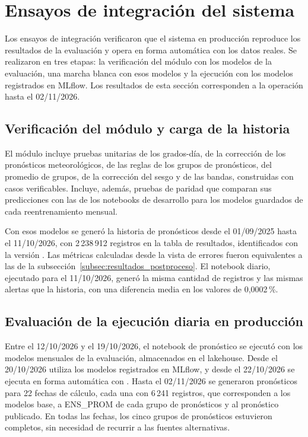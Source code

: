 \section{Ensayos de integración del sistema}
\label{sec:ensayos_integracion}

Los ensayos de integración verificaron que el sistema en producción reproduce los resultados de la evaluación y opera en forma automática con los datos reales. Se realizaron en tres etapas: la verificación del módulo con los modelos de la evaluación, una marcha blanca con esos modelos y la ejecución con los modelos registrados en MLflow. Los resultados de esta sección corresponden a la operación hasta el 02/11/2026.

\subsection{Verificación del módulo y carga de la historia}

El módulo  incluye pruebas unitarias de los grados-día, de la corrección de los pronósticos meteorológicos, de las reglas de los grupos de pronósticos, del promedio de grupos, de la corrección del sesgo y de las bandas, construidas con casos verificables. Incluye, además, pruebas de paridad que comparan sus predicciones con las de los notebooks de desarrollo para los modelos guardados de cada reentrenamiento mensual.

Con esos modelos se generó la historia de pronósticos desde el 01/09/2025 hasta el 11/10/2026, con 2\,238\,912 registros en la tabla de resultados, identificados con la versión . Las métricas calculadas desde la vista de errores fueron equivalentes a las de la subsección~\ref{subsec:resultados_postproceso}. El notebook diario, ejecutado para el 11/10/2026, generó la misma cantidad de registros y las mismas alertas que la historia, con una diferencia media en los valores de 0,0002\,\%.

\subsection{Evaluación de la ejecución diaria en producción}

Entre el 12/10/2026 y el 19/10/2026, el notebook de pronóstico se ejecutó con los modelos mensuales de la evaluación, almacenados en el lakehouse. Desde el 20/10/2026 utiliza los modelos registrados en MLflow, y desde el 22/10/2026 se ejecuta en forma automática con . Hasta el 02/11/2026 se generaron pronósticos para 22 fechas de cálculo, cada una con 6\,241 registros, que corresponden a los modelos base, a ENS\_PROM de cada grupo de pronósticos y al pronóstico publicado. En todas las fechas, los cinco grupos de pronósticos estuvieron completos, sin necesidad de recurrir a las fuentes alternativas.

